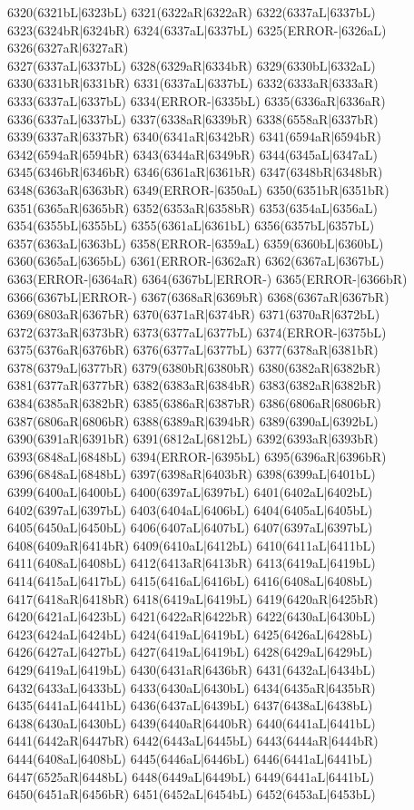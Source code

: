 6320(6321bL|6323bL) 6321(6322aR|6322aR) 6322(6337aL|6337bL) 6323(6324bR|6324bR) 6324(6337aL|6337bL) 6325(ERROR-|6326aL) 6326(6327aR|6327aR) \\6327(6337aL|6337bL) 6328(6329aR|6334bR) 6329(6330bL|6332aL) 6330(6331bR|6331bR) 6331(6337aL|6337bL) 6332(6333aR|6333aR) 6333(6337aL|6337bL) 6334(ERROR-|6335bL) 6335(6336aR|6336aR) \\6336(6337aL|6337bL) 6337(6338aR|6339bR) 6338(6558aR|6337bR) 6339(6337aR|6337bR) 6340(6341aR|6342bR) 6341(6594aR|6594bR) 6342(6594aR|6594bR) 6343(6344aR|6349bR) 6344(6345aL|6347aL) \\6345(6346bR|6346bR) 6346(6361aR|6361bR) 6347(6348bR|6348bR) 6348(6363aR|6363bR) 6349(ERROR-|6350aL) 6350(6351bR|6351bR) 6351(6365aR|6365bR) 6352(6353aR|6358bR) 6353(6354aL|6356aL) \\6354(6355bL|6355bL) 6355(6361aL|6361bL) 6356(6357bL|6357bL) 6357(6363aL|6363bL) 6358(ERROR-|6359aL) 6359(6360bL|6360bL) 6360(6365aL|6365bL) 6361(ERROR-|6362aR) 6362(6367aL|6367bL) \\6363(ERROR-|6364aR) 6364(6367bL|ERROR-) 6365(ERROR-|6366bR) 6366(6367bL|ERROR-) 6367(6368aR|6369bR) 6368(6367aR|6367bR) 6369(6803aR|6367bR) 6370(6371aR|6374bR) 6371(6370aR|6372bL) \\6372(6373aR|6373bR) 6373(6377aL|6377bL) 6374(ERROR-|6375bL) 6375(6376aR|6376bR) 6376(6377aL|6377bL) 6377(6378aR|6381bR) 6378(6379aL|6377bR) 6379(6380bR|6380bR) 6380(6382aR|6382bR) \\6381(6377aR|6377bR) 6382(6383aR|6384bR) 6383(6382aR|6382bR) 6384(6385aR|6382bR) 6385(6386aR|6387bR) 6386(6806aR|6806bR) 6387(6806aR|6806bR) 6388(6389aR|6394bR) 6389(6390aL|6392bL) \\6390(6391aR|6391bR) 6391(6812aL|6812bL) 6392(6393aR|6393bR) 6393(6848aL|6848bL) 6394(ERROR-|6395bL) 6395(6396aR|6396bR) 6396(6848aL|6848bL) 6397(6398aR|6403bR) 6398(6399aL|6401bL) \\6399(6400aL|6400bL) 6400(6397aL|6397bL) 6401(6402aL|6402bL) 6402(6397aL|6397bL) 6403(6404aL|6406bL) 6404(6405aL|6405bL) 6405(6450aL|6450bL) 6406(6407aL|6407bL) 6407(6397aL|6397bL) \\6408(6409aR|6414bR) 6409(6410aL|6412bL) 6410(6411aL|6411bL) 6411(6408aL|6408bL) 6412(6413aR|6413bR) 6413(6419aL|6419bL) 6414(6415aL|6417bL) 6415(6416aL|6416bL) 6416(6408aL|6408bL) \\6417(6418aR|6418bR) 6418(6419aL|6419bL) 6419(6420aR|6425bR) 6420(6421aL|6423bL) 6421(6422aR|6422bR) 6422(6430aL|6430bL) 6423(6424aL|6424bL) 6424(6419aL|6419bL) 6425(6426aL|6428bL) \\6426(6427aL|6427bL) 6427(6419aL|6419bL) 6428(6429aL|6429bL) 6429(6419aL|6419bL) 6430(6431aR|6436bR) 6431(6432aL|6434bL) 6432(6433aL|6433bL) 6433(6430aL|6430bL) 6434(6435aR|6435bR) \\6435(6441aL|6441bL) 6436(6437aL|6439bL) 6437(6438aL|6438bL) 6438(6430aL|6430bL) 6439(6440aR|6440bR) 6440(6441aL|6441bL) 6441(6442aR|6447bR) 6442(6443aL|6445bL) 6443(6444aR|6444bR) \\6444(6408aL|6408bL) 6445(6446aL|6446bL) 6446(6441aL|6441bL) 6447(6525aR|6448bL) 6448(6449aL|6449bL) 6449(6441aL|6441bL) 6450(6451aR|6456bR) 6451(6452aL|6454bL) 6452(6453aL|6453bL) 